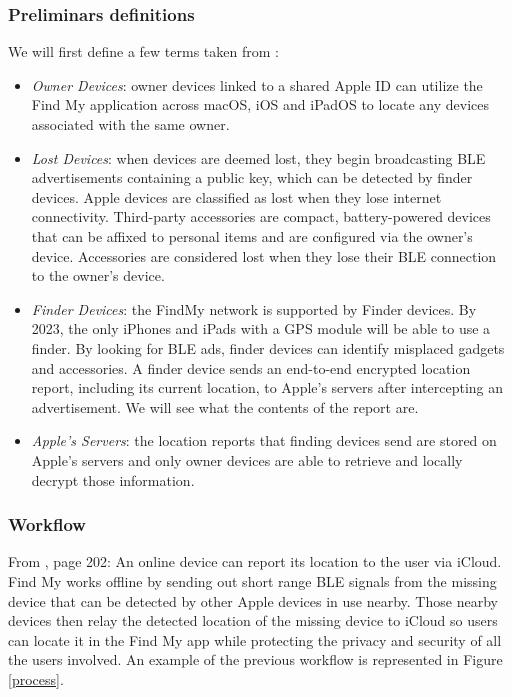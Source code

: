 \documentclass[english]{article}
\begin{document}
\subsubsection{Preliminars definitions}
We will first define a few terms taken from \cite{whocanfind}:
\begin{itemize}
  \item \textit{Owner Devices}: owner devices linked to a shared Apple ID can utilize the Find My application across macOS, iOS and iPadOS to locate any devices associated with the same owner.
  \item \textit{Lost Devices}: when devices are deemed lost, they begin broadcasting BLE advertisements containing a public key, which can be detected by finder devices. Apple devices are classified as lost when they lose internet connectivity. Third-party accessories \cite{gadget} are compact, battery-powered devices that can be affixed to personal items and are configured via the owner's device. Accessories are considered lost when they lose their BLE connection to the owner's device.
  \item \textit{Finder Devices}: the FindMy network is supported by Finder devices. By 2023, the only iPhones and iPads with a GPS module will be able to use a finder. By looking for BLE ads, finder devices can identify misplaced gadgets and accessories. A finder device sends an end-to-end encrypted location report, including its current location, to Apple's servers after intercepting an advertisement. We will see what the contents of the report are.
  \item \textit{Apple’s Servers}: the location reports that finding devices send are stored on Apple's servers and only owner devices are able to retrieve and locally decrypt those information.
\end{itemize}
\subsubsection{Workflow}
From \cite{aps}, page 202: An online device can report its location to the user via iCloud. Find My works offline by sending out short range BLE signals from the missing device that can be detected by other Apple devices in use nearby. Those nearby devices then relay the detected location of the missing device to iCloud so users can locate it in the Find My app while protecting the privacy and security of all the users involved. An example of the previous workflow is represented in Figure \ref{process}.
\end{document}

